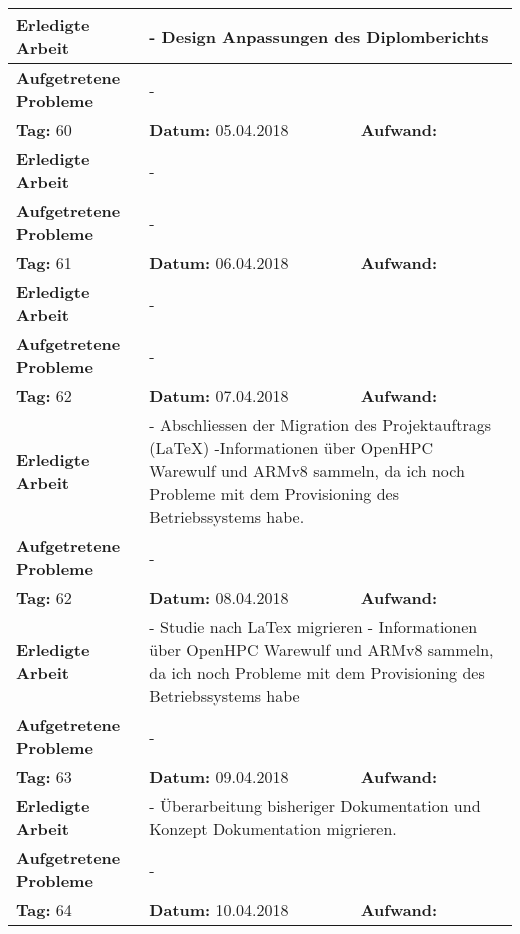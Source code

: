 \begin{longtable}{|p{5cm}|p{5cm}|p{6cm}|}
\textbf{Erledigte Arbeit} & \multicolumn{2}{p{11cm}|}{- Design Anpassungen des Diplomberichts} \\ \hline
\textbf{Aufgetretene Probleme} & \multicolumn{2}{p{11cm}|}{-} \\ \hline
\rowcolor{heading}\textbf{Tag:} 60 & \textbf{Datum:} 05.04.2018 & \textbf{Aufwand:} \\ \hline
\textbf{Erledigte Arbeit} & \multicolumn{2}{p{11cm}|}{-} \\ \hline
\textbf{Aufgetretene Probleme} & \multicolumn{2}{p{11cm}|}{-} \\ \hline
\rowcolor{heading}\textbf{Tag:} 61 & \textbf{Datum:} 06.04.2018 & \textbf{Aufwand:} \\ \hline
\textbf{Erledigte Arbeit} & \multicolumn{2}{p{11cm}|}{-} \\ \hline
\textbf{Aufgetretene Probleme} & \multicolumn{2}{p{11cm}|}{-} \\ \hline
\rowcolor{heading}\textbf{Tag:} 62 & \textbf{Datum:} 07.04.2018 & \textbf{Aufwand:} \\ \hline
\textbf{Erledigte Arbeit} & \multicolumn{2}{p{11cm}|}{- Abschliessen der Migration des Projektauftrags (LaTeX) \newline -Informationen über OpenHPC Warewulf und ARMv8 sammeln, da ich noch Probleme mit dem Provisioning des Betriebssystems habe.} \\ \hline
\textbf{Aufgetretene Probleme} & \multicolumn{2}{p{11cm}|}{-} \\ \hline
\rowcolor{heading}\textbf{Tag:} 62 & \textbf{Datum:} 08.04.2018 & \textbf{Aufwand:} \\ \hline
\textbf{Erledigte Arbeit} & \multicolumn{2}{p{11cm}|}{- Studie nach LaTex migrieren \newline
- Informationen über OpenHPC Warewulf und ARMv8 sammeln, da ich noch Probleme mit dem Provisioning des Betriebssystems habe} \\ \hline
\textbf{Aufgetretene Probleme} & \multicolumn{2}{p{11cm}|}{-} \\ \hline
\rowcolor{heading}\textbf{Tag:} 63 & \textbf{Datum:} 09.04.2018 & \textbf{Aufwand:} \\ \hline
\textbf{Erledigte Arbeit} & \multicolumn{2}{p{11cm}|}{- Überarbeitung bisheriger Dokumentation und Konzept Dokumentation migrieren.} \\ \hline
\textbf{Aufgetretene Probleme} & \multicolumn{2}{p{11cm}|}{-} \\ \hline
\rowcolor{heading}\textbf{Tag:} 64 & \textbf{Datum:} 10.04.2018 & \textbf{Aufwand:} \\ \hline

\end{longtable}
